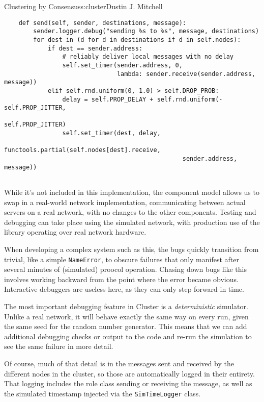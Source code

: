 \begin{aosachapter}{Clustering by Consensus}{s:cluster}{Dustin J. Mitchell}
\begin{verbatim}
    def send(self, sender, destinations, message):
        sender.logger.debug("sending %s to %s", message, destinations)
        for dest in (d for d in destinations if d in self.nodes):
            if dest == sender.address:
                # reliably deliver local messages with no delay
                self.set_timer(sender.address, 0,  
                               lambda: sender.receive(sender.address, message))
            elif self.rnd.uniform(0, 1.0) > self.DROP_PROB:
                delay = self.PROP_DELAY + self.rnd.uniform(-self.PROP_JITTER, 
                                                           self.PROP_JITTER)
                self.set_timer(dest, delay, 
                               functools.partial(self.nodes[dest].receive, 
                                                 sender.address, message))
    
\end{verbatim}

While it's not included in this implementation, the component model
allows us to swap in a real-world network implementation, communicating
between actual servers on a real network, with no changes to the other
components. Testing and debugging can take place using the simulated
network, with production use of the library operating over real network
hardware.

\label{debugging-support}

When developing a complex system such as this, the bugs quickly
transition from trivial, like a simple \texttt{NameError}, to obscure
failures that only manifest after several minutes of (simulated) proocol
operation. Chasing down bugs like this involves working backward from
the point where the error became obvious. Interactive debuggers are
useless here, as they can only step forward in time.

The most important debugging feature in Cluster is a
\emph{deterministic} simulator. Unlike a real network, it will behave
exactly the same way on every run, given the same seed for the random
number generator. This means that we can add additional debugging checks
or output to the code and re-run the simulation to see the same failure
in more detail.

Of course, much of that detail is in the messages sent and received by
the different nodes in the cluster, so those are automatically logged in
their entirety. That logging includes the role class sending or
receiving the message, as well as the simulated timestamp injected via
the \texttt{SimTimeLogger} class.


\end{aosachapter}

